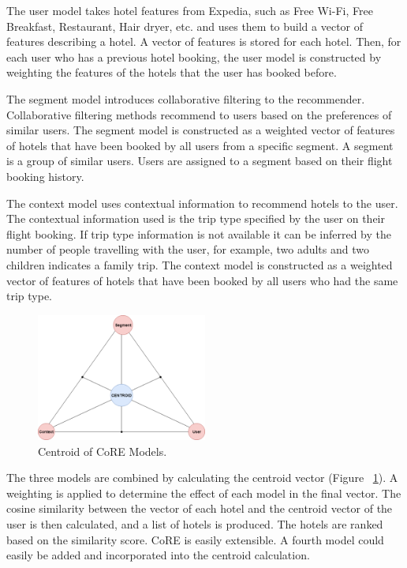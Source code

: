 The user model takes hotel features from Expedia, such as Free Wi-Fi, Free Breakfast, Restaurant, Hair dryer, etc. and uses them to build a vector of features describing a hotel. A vector of features is stored for each hotel. Then, for each user who has a previous hotel booking, the user model is constructed by weighting the features of the hotels that the user has booked before.

The segment model introduces collaborative filtering to the recommender. Collaborative filtering methods recommend to users based on the preferences of similar users. The segment model is constructed as a weighted vector of features of hotels that have been booked by all users from a specific segment. A segment is a group of similar users. Users are assigned to a segment based on their flight booking history.

The context model uses contextual information to recommend hotels to the user. The contextual information used is the trip type specified by the user on their flight booking. If trip type information is not available it can be inferred by the number of people travelling with the user, for example, two adults and two children indicates a family trip. The context model is constructed as a weighted vector of features of hotels that have been booked by all users who had the same trip type.

\begin{figure}[h!]
\centering
\includegraphics[width=0.5\textwidth]{design_and_methodology/centroid.png}
\caption{\label{fig:centroid} Centroid of CoRE Models.}
\end{figure}

The three models are combined by calculating the centroid vector (Figure ~\ref{fig:centroid}). A weighting is applied to determine the effect of each model in the final vector. The cosine similarity between the vector of each hotel and the centroid vector of the user is then calculated, and a list of hotels is produced. The hotels are ranked based on the similarity score. CoRE is easily extensible. A fourth model could easily be added and incorporated into the centroid calculation.

